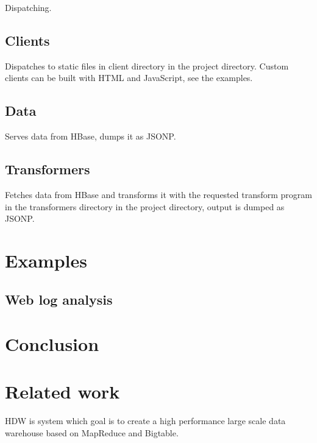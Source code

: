 \documentclass[a4paper,10pt]{book}
\begin{document}
Dispatching.



\section{Clients}

Dispatches to static files in client directory in the project directory.
Custom clients can be built with HTML and JavaScript, see the examples.



\section{Data}

Serves data from HBase, dumps it as JSONP.



\section{Transformers}

Fetches data from HBase and transforms it with the requested transform
program in the transformers directory in the project directory, output is
dumped as JSONP.



\chapter{Examples}

\section{Web log analysis}



\chapter{Conclusion}



\chapter{Related work}

HDW is system which goal is to create a high performance large scale data
warehouse based on MapReduce and Bigtable. \cite{hdw}



\pagebreak



 
\end{document}
